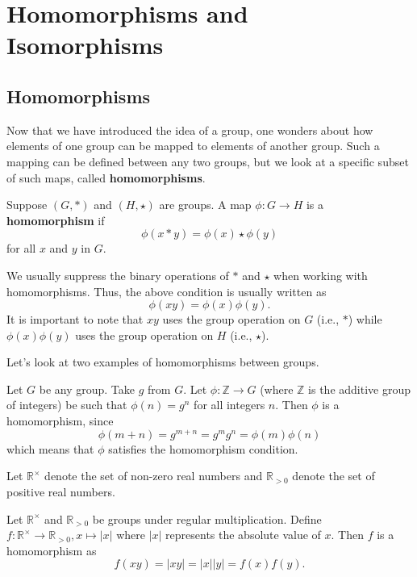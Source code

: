 \chapter{Homomorphisms and Isomorphisms}
\section{Homomorphisms}
Now that we have introduced the idea of a group, one wonders about how elements of one group can be mapped to elements of another group. Such a mapping can be defined between any two groups, but we look at a specific subset of such maps, called \textbf{homomorphisms}.

\begin{definition}
    Suppose $(G, \ast)$ and $(H, \star)$ are groups. A map $\phi: G \to H$ is a \textbf{homomorphism} if
    \[
        \phi(x \ast y) = \phi(x) \star \phi(y)
    \]
    for all $x$ and $y$ in $G$.
\end{definition}
\begin{remark}
    We usually suppress the binary operations of $\ast$ and $\star$ when working with homomorphisms. Thus, the above condition is usually written as
    \[
        \phi(xy) = \phi(x)\phi(y).
    \]
    It is important to note that $xy$ uses the group operation on $G$ (i.e., $\ast$) while $\phi(x)\phi(y)$ uses the group operation on $H$ (i.e., $\star$).
\end{remark}

\newpage

Let's look at two examples of homomorphisms between groups.
\begin{example}
    Let $G$ be any group. Take $g$ from $G$. Let $\phi: \mathbb{Z} \to G$ (where $\mathbb{Z}$ is the additive group of integers) be such that $\phi(n) = g^n$ for all integers $n$. Then $\phi$ is a homomorphism, since
    \[
        \phi(m + n) = g^{m+n} = g^m g^n = \phi(m)\phi(n)
    \]
    which means that $\phi$ satisfies the homomorphism condition.
\end{example}

\begin{example}
    Let $\mathbb{R}^\times$ denote the set of non-zero real numbers and $\mathbb{R}_{>0}$ denote the set of positive real numbers.

    Let $\mathbb{R}^\times$ and $\mathbb{R}_{>0}$ be groups under regular multiplication. Define $f: \mathbb{R}^\times \to \mathbb{R}_{>0}, x \mapsto |x|$ where $|x|$ represents the absolute value of $x$. Then $f$ is a homomorphism as
    \[
        f(xy) = |xy| = |x||y| = f(x)f(y).
    \]
\end{example}

